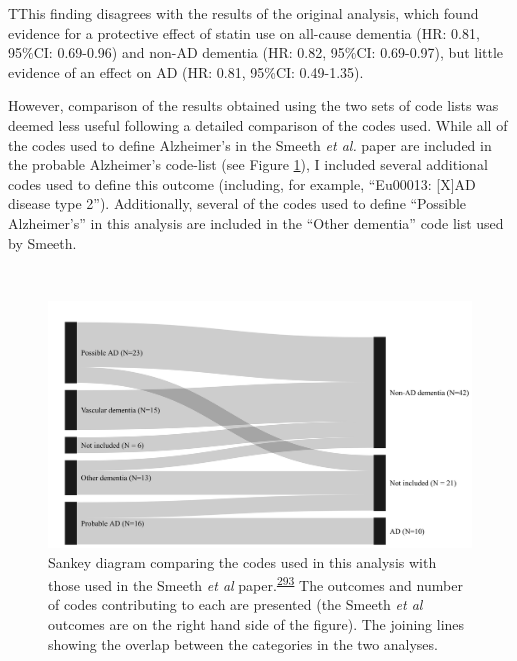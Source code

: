\documentclass[a4paper, twoside]{templates/ociamthesis}
\begin{document}
TThis finding disagrees with the results of the original analysis, which found evidence for a protective effect of statin use on all-cause dementia (HR: 0.81, 95\%CI: 0.69-0.96) and non-AD dementia (HR: 0.82, 95\%CI: 0.69-0.97), but little evidence of an effect on AD (HR: 0.81, 95\%CI: 0.49-1.35).

However, comparison of the results obtained using the two sets of code lists was deemed less useful following a detailed comparison of the codes used. While all of the codes used to define Alzheimer's in the Smeeth \emph{et al.} paper are included in the probable Alzheimer's code-list (see Figure \ref{fig:smeethComparison}), I included several additional codes used to define this outcome (including, for example, ``Eu00013: {[}X{]}AD disease type 2''). Additionally, several of the codes used to define ``Possible Alzheimer's'' in this analysis are included in the ``Other dementia'' code list used by Smeeth.

~





\begin{figure}[H]
\includegraphics[width=1\linewidth]{figures/cprd-analysis/sankey_diagram} \caption[Comparison of code used in this analysis with those used in the Smeeth et al.~2010 paper]{Sankey diagram comparing the codes used in this analysis with those used in the Smeeth \emph{et al} paper.\textsuperscript{\protect\hyperlink{ref-smeeth2009}{293}} The outcomes and number of codes contributing to each are presented (the Smeeth \emph{et al} outcomes are on the right hand side of the figure). The joining lines showing the overlap between the categories in the two analyses.}\label{fig:smeethComparison}
\end{figure}
\end{document}
